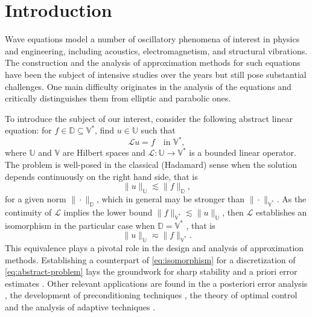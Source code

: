 \documentclass{amsart}
\theoremstyle{plain}
\theoremstyle{remark}
\numberwithin{equation}{section}
\numberwithin{theorem}{section}
\newcommand{\trial}{\mathbb{U}}
\newcommand{\test}{\mathbb{V}}
\newcommand{\data}{\mathbb{V}^*}
\begin{document}
	\maketitle
	
\section{Introduction}
\label{S:introduction}

Wave equations model a number of oscillatory phenomena of interest in physics and engineering, including acoustics, electromagnetism, and structural vibrations. The construction and the analysis of approximation methods for such equations have been the subject of intensive studies over the years but still pose substantial challenges. One main difficulty originates in the analysis of the equations and critically distinguishes them from elliptic and parabolic ones. 

To introduce the subject of our interest, consider the following abstract linear equation: for $f \in \mathbb{D}\subseteq\data$, find $u \in \trial$ such that
\begin{equation}
\label{eq:abstract-problem}
\mathcal{L} u = f \quad \text{in $\data$},
\end{equation}
where $\trial$ and $\test$ are Hilbert spaces and $\mathcal{L}: \trial \to \data$ is a bounded linear operator. The  problem is  well-posed in the classical (Hadamard) sense when the solution depends continuously on the right hand side, that is 
\begin{equation}
\label{eq:hadamard-well-posedness}
 \| u \|_{\trial} \lesssim \|f\|_{\mathbb{D}},
\end{equation} 
for a given norm $\|\cdot\|_{\mathbb{D}}$, which in general may be stronger than  $\|\cdot\|_{\data}$. As the continuity of $\mathcal{L}$ implies the lower bound $\|f\|_{\data} \lesssim \| u \|_{\trial}$, then $\mathcal{L}$ establishes an isomorphism in the particular case when $\mathbb D = \data$ , that is
\begin{equation}
\label{eq:isomorphism}
  \| u \|_{\trial} \eqsim \|f\|_{\data}.
\end{equation} 
This equivalence plays a pivotal role in the design and analysis of approximation methods. Establishing a counterpart of \eqref{eq:isomorphism} for a discretization of \eqref{eq:abstract-problem} lays the groundwork for sharp stability and a priori error estimates \cite{Babuska:70, Brezzi:74}. Other relevant applications are found in the a posteriori error analysis \cite{Verfurth:13}, the development of preconditioning techniques \cite{Hiptmair:06, Mardal.Winther:11}, the theory of optimal control \cite{Loscher.Steinbach} and the analysis of adaptive techniques \cite{Feischl:22}.
\end{document}
